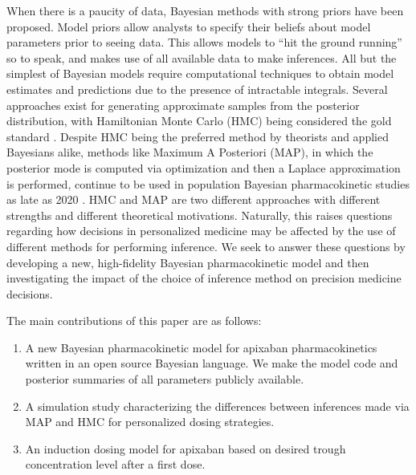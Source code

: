 When there is a paucity of data, Bayesian methods with strong priors have been proposed.  Model priors allow analysts to specify their beliefs about model parameters prior to seeing data.  This allows models to ``hit the ground running'' so to speak, and makes use of all available data to make inferences.  All but the simplest of Bayesian models require computational techniques to obtain model estimates and predictions due to the presence of intractable integrals. Several approaches exist for generating approximate samples from the posterior distribution, with Hamiltonian Monte Carlo (HMC) being considered the gold standard \cite{Neal1996-vn, Matthew_D_Hoffman2014-in, Carpenter2017-qf, Tripuraneni2017-oh}. Despite HMC being the preferred method by theorists and applied Bayesians alike, methods like Maximum A Posteriori (MAP), in which the posterior mode is computed via optimization and then a Laplace approximation is performed, continue to be used in population Bayesian pharmacokinetic studies as late as 2020 \cite{Brooks2016-li, Nguyen2016-pg,  Preijers2019-kc,Stifft2020-uq}. HMC and MAP are two different approaches with different strengths and different theoretical motivations. Naturally, this raises questions regarding how decisions in personalized medicine may be affected by the use of different methods for performing inference. We seek to answer these questions by developing a new, high-fidelity Bayesian pharmacokinetic model and then investigating the impact of the choice of inference method on precision medicine decisions.


The main contributions of this paper are as follows: 

\begin{enumerate}
\item A new Bayesian pharmacokinetic model for apixaban pharmacokinetics written in an open source Bayesian language.  We make the model code and posterior summaries of all parameters publicly available.

\item A simulation study characterizing the differences between inferences made via MAP and HMC for personalized dosing strategies.

\item An induction dosing model for apixaban based on desired trough concentration level after a first dose.
\end{enumerate}





